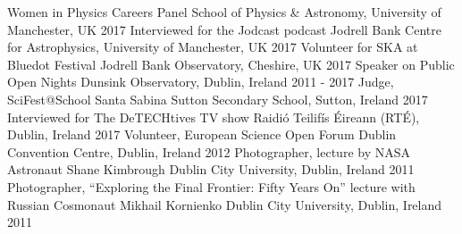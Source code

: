 \begin{cvpress}
   \cvpres
   	{Women in Physics Careers Panel}
    {School of Physics \& Astronomy, University of Manchester, UK}
    {2017}
   \cvpres
   {Interviewed for the Jodcast podcast}
    {Jodrell Bank Centre for Astrophysics, University of Manchester, UK}
    {2017}
   \cvpres
   {Volunteer for SKA at Bluedot Festival}
    {Jodrell Bank Observatory, Cheshire, UK}
    {2017}
   \cvpres
   {Speaker on Public Open Nights}
    {Dunsink Observatory, Dublin, Ireland}
    {2011 - 2017}
   \cvpres
   	{Judge, SciFest@School}
    {Santa Sabina Sutton Secondary School, Sutton, Ireland}
    {2017}
   \cvpres
   	{Interviewed for The DeTECHtives TV show}
    {Raidi{\'o} Teilif{\'i}s {\'E}ireann (RT{\'E}), Dublin, Ireland}
    {2017}
   \cvpres
   	{Volunteer, European Science Open Forum}
    {Dublin Convention Centre, Dublin, Ireland}
    {2012}
   \cvpres
   	{Photographer, lecture by NASA Astronaut Shane Kimbrough}
    {Dublin City University, Dublin, Ireland}
    {2011}
   \cvpres
   	{Photographer, ``Exploring the Final Frontier: Fifty Years On'' lecture with Russian Cosmonaut Mikhail Kornienko}
    {Dublin City University, Dublin, Ireland}
    {2011}
\end{cvpress}


